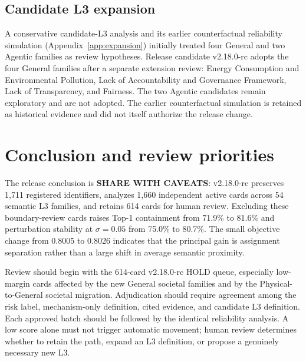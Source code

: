 \documentclass[11pt,a4paper]{article}
\begin{document}
\subsection{Candidate L3 expansion}

A conservative candidate-L3 analysis and its earlier counterfactual reliability
simulation (Appendix~\ref{app:expansion}) initially treated four General and
two Agentic families as review hypotheses. Release candidate v2.18.0-rc adopts
the four General families after a separate extension review: Energy Consumption
and Environmental Pollution, Lack of Accountability and Governance Framework,
Lack of Transparency, and Fairness. The two Agentic candidates remain
exploratory and are not adopted. The earlier counterfactual simulation is
retained as historical evidence and did not itself authorize the release
change.

\section{Conclusion and review priorities}
\label{sec:conclusion}

The release conclusion is \textbf{SHARE WITH CAVEATS}: v2.18.0-rc preserves
1,711 registered identifiers, analyzes 1,660 independent active cards across
54 semantic L3 families, and retains 614 cards for human review. Excluding
these boundary-review cards raises Top-1 containment from 71.9\% to 81.6\%
and perturbation stability at $\sigma=0.05$ from 75.0\% to 80.7\%. The small
objective change from 0.8005 to 0.8026 indicates that the principal gain is
assignment separation rather than a large shift in average semantic proximity.

Review should begin with the 614-card v2.18.0-rc HOLD queue, especially
low-margin cards affected by the new General societal families and by the
Physical-to-General societal migration. Adjudication should require agreement
among the risk label, mechanism-only definition, cited evidence, and candidate
L3 definition. Each approved batch should be followed by the identical
reliability analysis. A low score alone must not trigger automatic movement;
human review determines whether to retain the path, expand an L3 definition,
or propose a genuinely necessary new L3.
\end{document}
